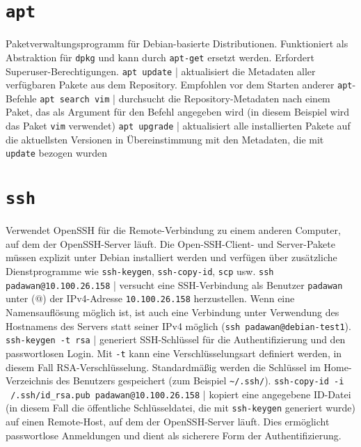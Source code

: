 \documentclass{article}
\newcommand{\doublebreak}{\break\break}
\begin{document}
	\section{\texttt{apt}}
	Paketverwaltungsprogramm für Debian-basierte Distributionen. Funktioniert als Abstraktion für \texttt{dpkg} und kann durch \texttt{apt-get} ersetzt werden. Erfordert Superuser-Berechtigungen.
	\doublebreak
	\texttt{apt update} | aktualisiert die Metadaten aller verfügbaren Pakete aus dem Repository. Empfohlen vor dem Starten anderer \texttt{apt}-Befehle
	\doublebreak
	\texttt{apt search vim} | durchsucht die Repository-Metadaten nach einem Paket, das als Argument für den Befehl angegeben wird (in diesem Beispiel wird das Paket \texttt{vim} verwendet)
	\doublebreak
	\texttt{apt upgrade} | aktualisiert alle installierten Pakete auf die aktuellsten Versionen in Übereinstimmung mit den Metadaten, die mit \texttt{update} bezogen wurden
	
	\section{\texttt{ssh}}
	Verwendet OpenSSH für die Remote-Verbindung zu einem anderen Computer, auf dem der OpenSSH-Server läuft. Die Open-SSH-Client- und Server-Pakete müssen explizit unter Debian installiert werden und verfügen über zusätzliche Dienstprogramme wie \texttt{ssh-keygen}, \texttt{ssh-copy-id}, \texttt{scp} usw.
	\doublebreak
	\texttt{ssh padawan@10.100.26.158} | versucht eine SSH-Verbindung als Benutzer \texttt{padawan} unter (@) der IPv4-Adresse \texttt{10.100.26.158} herzustellen. Wenn eine Namensauflösung möglich ist, ist auch eine Verbindung unter Verwendung des Hostnamens des Servers statt seiner IPv4 möglich (\texttt{ssh padawan@debian-test1}).
	\doublebreak
	\texttt{ssh-keygen -t rsa} | generiert SSH-Schlüssel für die Authentifizierung und den passwortlosen Login. Mit \texttt{-t} kann eine Verschlüsselungsart definiert werden, in diesem Fall RSA-Verschlüsselung. Standardmäßig werden die Schlüssel im Home-Verzeichnis des Benutzers gespeichert (zum Beispiel \texttt{\textasciitilde{}/.ssh/}).
	\doublebreak
	\texttt{ssh-copy-id -i ~/.ssh/id\_rsa.pub padawan@10.100.26.158} | kopiert eine angegebene ID-Datei (in diesem Fall die öffentliche Schlüsseldatei, die mit \texttt{ssh-keygen} generiert wurde) auf einen Remote-Host, auf dem der OpenSSH-Server läuft. Dies ermöglicht passwortlose Anmeldungen und dient als sicherere Form der Authentifizierung.
	
	\newpage
	
\end{document}
